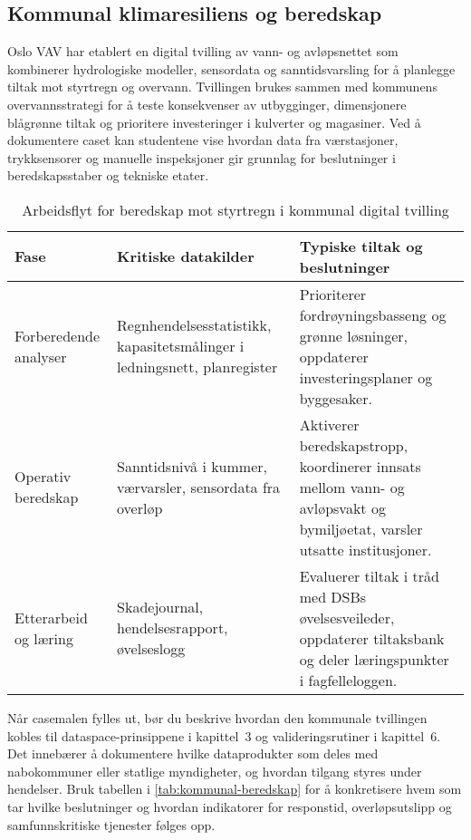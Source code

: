 \subsection*{Kommunal klimaresiliens og beredskap}
Oslo VAV har etablert en digital tvilling av vann- og avløpsnettet som kombinerer hydrologiske modeller, sensordata og sanntidsvarsling for å planlegge tiltak mot styrtregn og overvann.\citep{oslovav2023digital} Tvillingen brukes sammen med kommunens overvannsstrategi for å teste konsekvenser av utbygginger, dimensjonere blågrønne tiltak og prioritere investeringer i kulverter og magasiner.\citep{oslo2023overvann} Ved å dokumentere caset kan studentene vise hvordan data fra værstasjoner, trykksensorer og manuelle inspeksjoner gir grunnlag for beslutninger i beredskapsstaber og tekniske etater.

\begin{table}[h]
    \centering
    \caption{Arbeidsflyt for beredskap mot styrtregn i kommunal digital tvilling}
    \label{tab:kommunal-beredskap}
    \begin{tabular}{p{3.4cm}p{4.5cm}p{5.0cm}}
        \toprule
        Fase & Kritiske datakilder & Typiske tiltak og beslutninger \\
        \midrule
        Forberedende analyser & Regnhendelsesstatistikk, kapasitetsmålinger i ledningsnett, planregister & Prioriterer fordrøyningsbasseng og grønne løsninger, oppdaterer investeringsplaner og byggesaker. \\
        Operativ beredskap & Sanntidsnivå i kummer, værvarsler, sensordata fra overløp & Aktiverer beredskapstropp, koordinerer innsats mellom vann- og avløpsvakt og bymiljøetat, varsler utsatte institusjoner. \\
        Etterarbeid og læring & Skadejournal, hendelsesrapport, øvelseslogg & Evaluerer tiltak i tråd med DSBs øvelsesveileder, oppdaterer tiltaksbank og deler læringspunkter i fagfelleloggen.\citep{dsb2024nser,dsb2023ovelser} \\
        \bottomrule
    \end{tabular}
\end{table}

Når casemalen fylles ut, bør du beskrive hvordan den kommunale tvillingen kobles til dataspace-prinsippene i kapittel~3 og valideringsrutiner i kapittel~6. Det innebærer å dokumentere hvilke dataprodukter som deles med nabokommuner eller statlige myndigheter, og hvordan tilgang styres under hendelser. Bruk tabellen i \autoref{tab:kommunal-beredskap} for å konkretisere hvem som tar hvilke beslutninger og hvordan indikatorer for responstid, overløpsutslipp og samfunnskritiske tjenester følges opp.

